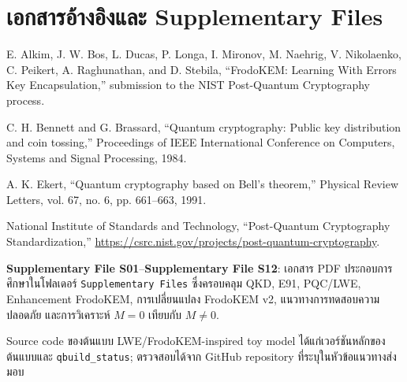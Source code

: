 \documentclass[14pt,a4paper]{extarticle}
\newcommand{\code}[1]{\texttt{#1}}
\newcommand{\suppfile}[1]{\textbf{Supplementary File #1}}
\begin{document}
\section*{เอกสารอ้างอิงและ Supplementary Files}
\begin{enumerate}[label={[\arabic*]}]
    \item E. Alkim, J. W. Bos, L. Ducas, P. Longa, I. Mironov, M. Naehrig, V. Nikolaenko, C. Peikert, A. Raghunathan, and D. Stebila, ``FrodoKEM: Learning With Errors Key Encapsulation,'' submission to the NIST Post-Quantum Cryptography process.
    \item C. H. Bennett and G. Brassard, ``Quantum cryptography: Public key distribution and coin tossing,'' Proceedings of IEEE International Conference on Computers, Systems and Signal Processing, 1984.
    \item A. K. Ekert, ``Quantum cryptography based on Bell's theorem,'' Physical Review Letters, vol. 67, no. 6, pp. 661--663, 1991.
    \item National Institute of Standards and Technology, ``Post-Quantum Cryptography Standardization,'' \url{https://csrc.nist.gov/projects/post-quantum-cryptography}.
    \item \suppfile{S01}--\suppfile{S12}: เอกสาร PDF ประกอบการศึกษาในโฟลเดอร์ \code{Supplementary Files} ซึ่งครอบคลุม QKD, E91, PQC/LWE, Enhancement FrodoKEM, การเปลี่ยนแปลง FrodoKEM v2, แนวทางการทดสอบความปลอดภัย และการวิเคราะห์ $M=0$ เทียบกับ $M\neq0$.
    \item Source code ของต้นแบบ LWE/FrodoKEM-inspired toy model ได้แก่เวอร์ชันหลักของต้นแบบและ \code{qbuild\_status}; ตรวจสอบได้จาก GitHub repository ที่ระบุในหัวข้อแนวทางส่งมอบ 
\end{enumerate}
\end{document}
